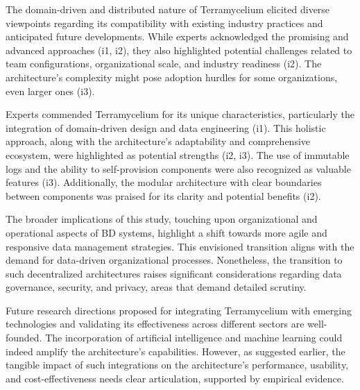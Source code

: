 \documentclass[preprint,12pt]{elsarticle}
\begin{document}

The domain-driven and distributed nature of Terramycelium elicited diverse viewpoints regarding its compatibility with existing industry practices and anticipated future developments. While experts acknowledged the promising and advanced approaches (i1, i2), they also highlighted potential challenges related to team configurations, organizational scale, and industry readiness (i2). The architecture's complexity might pose adoption hurdles for some organizations, even larger ones (i3).

Experts commended Terramycelium for its unique characteristics, particularly the integration of domain-driven design and data engineering (i1). This holistic approach, along with the architecture's adaptability and comprehensive ecosystem, were highlighted as potential strengths (i2, i3). The use of immutable logs and the ability to self-provision components were also recognized as valuable features (i3). Additionally, the modular architecture with clear boundaries between components was praised for its clarity and potential benefits (i2).

The broader implications of this study, touching upon organizational and operational aspects of BD systems, highlight a shift towards more agile and responsive data management strategies. This envisioned transition aligns with the demand for data-driven organizational processes. Nonetheless, the transition to such decentralized architectures raises significant considerations regarding data governance, security, and privacy, areas that demand detailed scrutiny.

Future research directions proposed for integrating Terramycelium with emerging technologies and validating its effectiveness across different sectors are well-founded. The incorporation of artificial intelligence and machine learning could indeed amplify the architecture's capabilities. However, as suggested earlier, the tangible impact of such integrations on the architecture's performance, usability, and cost-effectiveness needs clear articulation, supported by empirical evidence.
\end{document}
